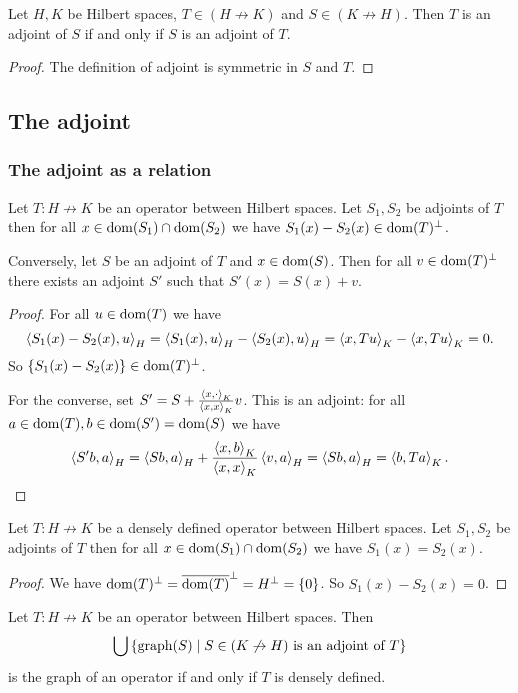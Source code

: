 \begin{lemma} \label{adjointRequirementSymmetric}
Let $H,K$ be Hilbert spaces, $T\in (H\not\to K)$ and $S\in(K\not\to H)$. Then $T$ is an adjoint of $S$ \textup{if and only if} $S$ is an adjoint of $T$.
\end{lemma}
\begin{proof}
The definition of adjoint is symmetric in $S$ and $T$.
\end{proof}

\subsection{The adjoint}
\subsubsection{The adjoint as a relation}
\begin{lemma}
Let $T: H\not\to K$ be an operator between Hilbert spaces. Let $S_1, S_2$ be adjoints of $T$ then for all $x\in \operatorname{dom}(S_1)\cap\operatorname{dom}(S_2)$ we have $S_1(x) - S_2(x) \in \operatorname{dom}(T)^\perp$.

Conversely, let $S$ be an adjoint of $T$ and $x\in\operatorname{dom}(S)$. Then for all $v\in \operatorname{dom}(T)^\perp$ there exists an adjoint $S'$ such that $S'(x) = S(x) + v$.
\end{lemma}
\begin{proof}
For all $u\in \operatorname{dom}(T)$ we have
\[ \left\langle S_1(x) - S_2(x), u \right\rangle_H = \left\langle S_1(x), u \right\rangle_H - \left\langle S_2(x), u \right\rangle_H = \left\langle x, Tu \right\rangle_K - \left\langle x, Tu \right\rangle_K = 0. \]
So $\{S_1(x) - S_2(x)\} \in \operatorname{dom}(T)^\perp$.

For the converse, set $S' = S + \frac{\left\langle x,\cdot \right\rangle_K}{\left\langle x,x \right\rangle_K}v$. This is an adjoint: for all $a\in \operatorname{dom}(T), b\in \operatorname{dom}(S') = \operatorname{dom}(S)$ we have
\[  \left\langle S' b,a \right\rangle_H = \left\langle Sb, a \right\rangle_H + \frac{\left\langle x,b \right\rangle_K}{\left\langle x,x \right\rangle_K}\left\langle v,a \right\rangle_H = \left\langle Sb, a \right\rangle_H = \left\langle b,Ta \right\rangle_K. \]
\end{proof}
\begin{corollary} \label{agreementAdjoints}
Let $T: H\not\to K$ be a densely defined operator between Hilbert spaces. Let $S_1, S_2$ be adjoints of $T$ then for all $x\in \operatorname{dom}(S_1)\cap\operatorname{dom}(S_2)$ we have $S_1(x) = S_2(x)$.
\end{corollary}
\begin{proof}
We have $\operatorname{dom}(T)^\perp = \overline{\operatorname{dom}(T)}^\perp = H^\perp = \{0\}$. So $S_1(x) - S_2(x) = 0$.
\end{proof}
\begin{corollary} \label{maximalAdjointIsOperator}
Let $T: H\not\to K$ be an operator between Hilbert spaces. Then
\[ \bigcup\left\{ \operatorname{graph}(S) \;\middle|\; \text{$S\in (K\not\to H)$ is an adjoint of $T$} \right\} \]
is the graph of an operator \textup{if and only if} $T$ is densely defined.
\end{corollary}

